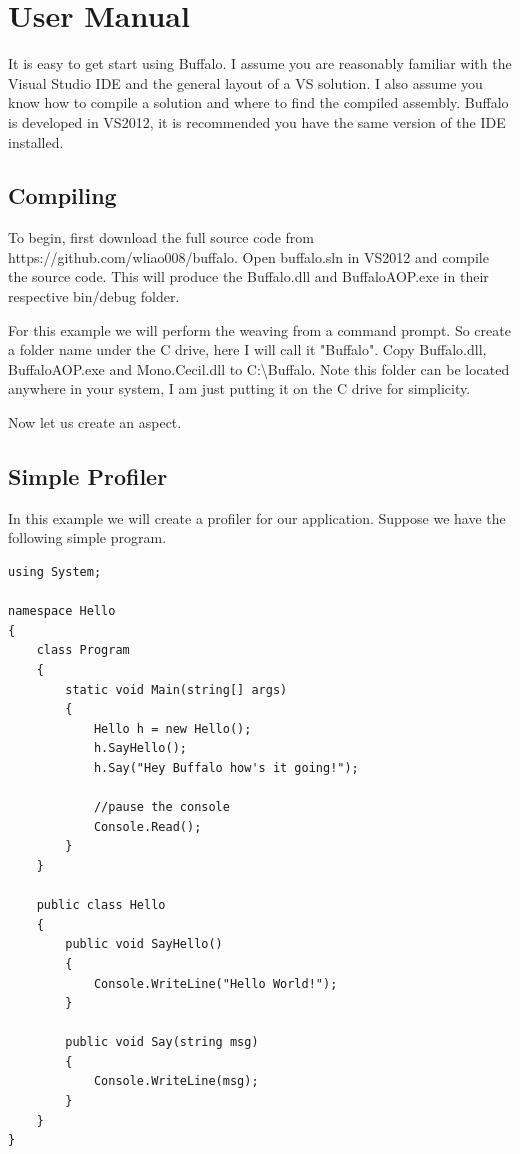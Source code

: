 \chapter{User Manual}

It is easy to get start using Buffalo. I assume you are reasonably familiar with the Visual Studio IDE and the general layout of a VS solution. I also assume you know how to compile a solution and where to find the compiled assembly. Buffalo is developed in VS2012, it is recommended you have the same version of the IDE installed.

\section{Compiling}
To begin, first download the full source code from https://github.com/wliao008/buffalo. Open buffalo.sln in VS2012 and compile the source code. This will produce the Buffalo.dll and BuffaloAOP.exe in their respective bin/debug folder.

For this example we will perform the weaving from a command prompt. So create a folder name under the C drive, here I will call it "Buffalo". Copy Buffalo.dll, BuffaloAOP.exe and Mono.Cecil.dll to C:\textbackslash{Buffalo}. Note this folder can be located anywhere in your system, I am just putting it on the C drive for simplicity.

Now let us create an aspect.

\section{Simple Profiler}
In this example we will create a profiler for our application. Suppose we have the following simple program.

\begin{lstlisting}[caption={Hello program}, label=helloprogram, frame=tb, basicstyle=\scriptsize]
using System;

namespace Hello
{
    class Program
    {
        static void Main(string[] args)
        {
            Hello h = new Hello();
            h.SayHello();
            h.Say("Hey Buffalo how's it going!");

            //pause the console
            Console.Read();
        }
    }

    public class Hello
    {
        public void SayHello()
        {
            Console.WriteLine("Hello World!");
        }

        public void Say(string msg)
        {
            Console.WriteLine(msg);
        }
    }
}
\end{lstlisting}

